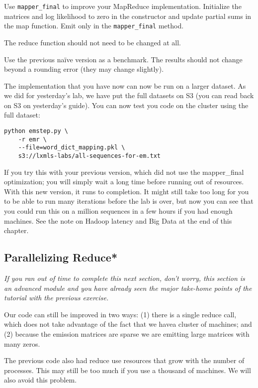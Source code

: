 \begin{exercise}
Use \verb+mapper_final+ to improve your MapReduce implementation. Initialize the
matrices and log likelihood to zero in the constructor and update partial sums
in the map function. Emit only in the \verb+mapper_final+ method.

The reduce function should not need to be changed at all.

Use the previous naïve version as a benchmark. The results should not change
beyond a rounding error (they may change slightly).
\end{exercise}

The implementation that you have now can now be run on a larger dataset. As we
did for yesterday's lab, we have put the full datasets on S3 (you can read back
on S3 on yesterday's guide). You can now test you code on the cluster using the
full dataset:

\begin{verbatim}
python emstep.py \
    -r emr \
    --file=word_dict_mapping.pkl \
    s3://lxmls-labs/all-sequences-for-em.txt
\end{verbatim}

If you try this with your previous version, which did not use the mapper\_final
optimization; you will simply wait a long time before running out of
resources. With this new version, it runs to completion. It might still take
too long for you to be able to run many iterations before the lab is over, but
now you can see that you could run this on a million sequences in a few hours
if you had enough machines. See the note on Hadoop latency and Big Data at the
end of this chapter.

\subsection{Parallelizing Reduce*}

\emph{If you ran out of time to complete this next section, don't worry, this
section is an advanced module and you have already seen the major take-home
points of the tutorial with the previous exercise.}

Our code can still be improved in two ways: (1) there is a single reduce call,
which does not take advantage of the fact that we havea cluster of machines;
and (2) because the emission matrices are sparse we are emitting large matrices
with many zeros. %

The previous code also had reduce use resources that grow with the number of
processes. This may still be too much if you use a thousand of machines. We
will also avoid this problem.

